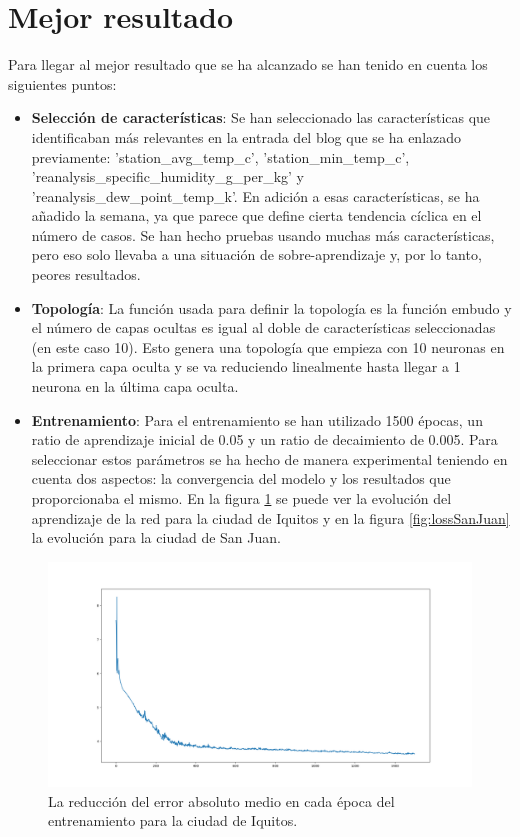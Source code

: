 \documentclass[acmtog, screen]{acmart}
\begin{document}
\section{Mejor resultado}
Para llegar al mejor resultado que se ha alcanzado se han tenido en cuenta los siguientes puntos:
\begin{itemize}
	\item \textbf{Selección de características}: Se han seleccionado las características que identificaban más relevantes en la entrada del blog que se ha enlazado previamente: 'station\_avg\_temp\_c', 'station\_min\_temp\_c', 'reanalysis\_specific\_humidity\_g\_per\_kg' y 'reanalysis\_dew\_point\_temp\_k'. En adición a esas características, se ha añadido la semana, ya que parece que define cierta tendencia cíclica en el número de casos. Se han hecho pruebas usando muchas más características, pero eso solo llevaba a una situación de sobre-aprendizaje y, por lo tanto, peores resultados.
	\item \textbf{Topología}: La función usada para definir la topología es la función embudo y el número de capas ocultas es igual al doble de características seleccionadas (en este caso 10). Esto genera una topología que empieza con 10 neuronas en la primera capa oculta y se va reduciendo linealmente hasta llegar a 1 neurona en la última capa oculta.
	\item \textbf{Entrenamiento}: Para el entrenamiento se han utilizado 1500 épocas, un ratio de aprendizaje inicial de 0.05 y un ratio de decaimiento de 0.005. Para seleccionar estos parámetros se ha hecho de manera experimental teniendo en cuenta dos aspectos: la convergencia del modelo y los resultados que proporcionaba el mismo. En la figura \ref{fig:lossIquitos} se puede ver la evolución del aprendizaje de la red para la ciudad de Iquitos y en la figura \ref{fig:lossSanJuan} la evolución para la ciudad de San Juan.
\end{itemize}
\begin{figure}[h]
	\includegraphics[width=\columnwidth]{lossIquitos}
	\caption{La reducción del error absoluto medio en cada época del entrenamiento para la ciudad de Iquitos.}
	\label{fig:lossIquitos}
\end{figure}
\end{document}

